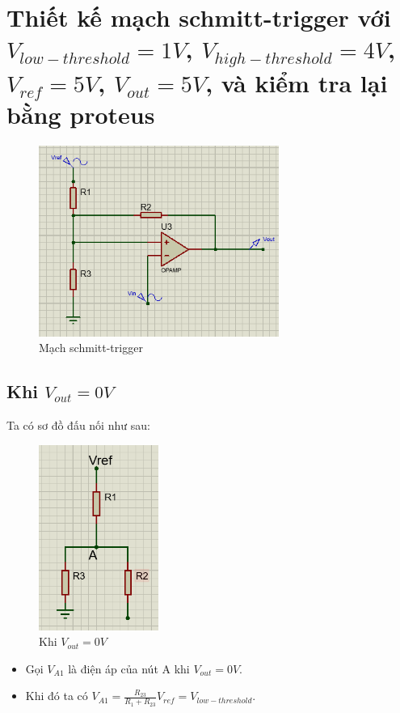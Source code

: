 \cleardoublepage
\section{Thiết kế mạch schmitt-trigger với $V_{low-threshold} = 1V$, $V_{high-threshold} = 4V$, $V_{ref} = 5V$, $V_{out} = 5V$, và kiểm tra lại bằng proteus}
\begin{figure}[H]
    \centering
    \includegraphics[width=0.7\textwidth]{pictures/smith}
    \caption{Mạch schmitt-trigger}
\end{figure}
    \subsection{Khi $V_{out} = 0V$}
Ta có sơ đồ đấu nối như sau:
\begin{figure}[H]
    \centering
    \includegraphics[width=0.35\textwidth]{pictures/Vo_0.png}
    \caption{Khi $V_{out} = 0V$}
\end{figure}
\begin{itemize}
    \item Gọi $V_{A1}$ là điện áp của nút A khi $V_{out} = 0V$.
    \item Khi đó ta có $V_{A1} = \frac{R_{23}}{R_1+R_{23}}V_{ref} = V_{low-threshold}$.
\end{itemize}
